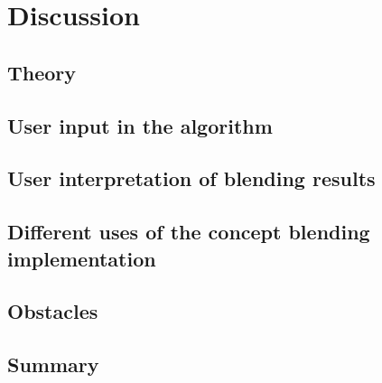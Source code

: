 
\chapter{Discussion} %

\label{Chapter7} %


\section{Theory}


\section{User input in the algorithm}


\section{User interpretation of blending results}


\section{Different uses of the concept blending implementation}


\section{Obstacles}


\section{Summary}

